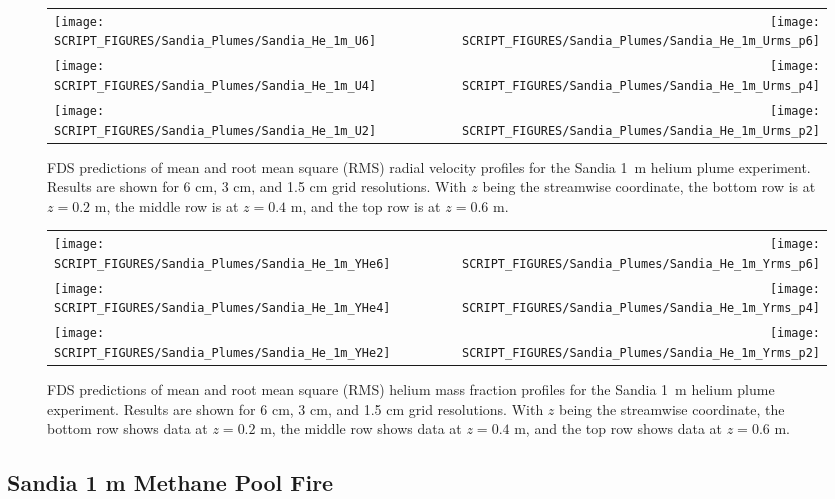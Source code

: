 \begin{figure}[p]
\begin{tabular*}{\textwidth}{l@{\extracolsep{\fill}}r}
\texttt{[image: SCRIPT\_FIGURES/Sandia\_Plumes/Sandia\_He\_1m\_U6]} &
\texttt{[image: SCRIPT\_FIGURES/Sandia\_Plumes/Sandia\_He\_1m\_Urms\_p6]} \\
\texttt{[image: SCRIPT\_FIGURES/Sandia\_Plumes/Sandia\_He\_1m\_U4]} &
\texttt{[image: SCRIPT\_FIGURES/Sandia\_Plumes/Sandia\_He\_1m\_Urms\_p4]} \\
\texttt{[image: SCRIPT\_FIGURES/Sandia\_Plumes/Sandia\_He\_1m\_U2]} &
\texttt{[image: SCRIPT\_FIGURES/Sandia\_Plumes/Sandia\_He\_1m\_Urms\_p2]}
\end{tabular*}
\caption[Sandia 1~m helium plume radial velocity profiles.]
{FDS predictions of mean and root mean square (RMS) radial velocity profiles for the Sandia 1~m helium plume experiment. Results are shown for 6 cm, 3 cm, and 1.5 cm grid resolutions. With $z$ being the streamwise coordinate, the bottom row is at $z=0.2$ m, the middle row is at $z=0.4$ m, and the top row is at $z=0.6$ m.}
\label{Sandia_He_1m_velocity_rms}
\end{figure}

\begin{figure}[p]
\begin{tabular*}{\textwidth}{l@{\extracolsep{\fill}}r}
\texttt{[image: SCRIPT\_FIGURES/Sandia\_Plumes/Sandia\_He\_1m\_YHe6]} &
\texttt{[image: SCRIPT\_FIGURES/Sandia\_Plumes/Sandia\_He\_1m\_Yrms\_p6]} \\
\texttt{[image: SCRIPT\_FIGURES/Sandia\_Plumes/Sandia\_He\_1m\_YHe4]} &
\texttt{[image: SCRIPT\_FIGURES/Sandia\_Plumes/Sandia\_He\_1m\_Yrms\_p4]} \\
\texttt{[image: SCRIPT\_FIGURES/Sandia\_Plumes/Sandia\_He\_1m\_YHe2]} &
\texttt{[image: SCRIPT\_FIGURES/Sandia\_Plumes/Sandia\_He\_1m\_Yrms\_p2]}
\end{tabular*}
\caption[Sandia 1~m helium plume mean and RMS mass fraction profiles.]
{FDS predictions of mean and root mean square (RMS) helium mass fraction profiles for the Sandia 1~m helium plume experiment. Results are shown for 6 cm, 3 cm, and 1.5 cm grid resolutions. With $z$ being the streamwise coordinate, the bottom row shows data at $z=0.2$ m, the middle row shows data at $z=0.4$ m, and the top row shows data at $z=0.6$ m.}
\label{Sandia_He_1m_massfraction}
\end{figure}

\clearpage

\subsection{Sandia 1 m Methane Pool Fire}
\label{Sandia_methane}

